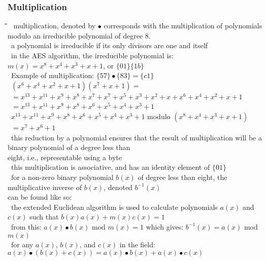 \documentclass[10pt,letterpaper]{scrartcl}
\newcommand{\tbul}{\textbullet}
\newcommand{\tend}{\>\textendash}
\newcommand{\tabDef}{\hspace{2em}\=\hspace{2em}\=\hspace{2em}\=\hspace{2em}\=\kill}
\begin{document}
\subsubsection*{Multiplication}\begin{tabbing}\tabDef
\tbul\ multiplication, denoted by $\bullet$ corresponds with the multiplication of polynomials modulo an irreducible polynomial of degree 8. \\
    \tend\ a polynomial is irreducible if its only divisors are one and itself \\
\tbul\ in the AES algorithm, the irreducible polynomial is: $m(x)=x^8+x^4+x^3+x+1$, or $\{01\}\{1b\}$ \\
\tbul\ Example of multiplication: $\{57\}\bullet \{83\} = \{c1\}$ \\
\>\ $(x^6 + x^4 + x^2 + x + 1)(x^7 + x + 1) = $ \\
\>\>\>\>\ $=x^{13} + x^{11} + x^9 + x^8 + x^7 + x^7 + x^5 + x^3 + x^2 + x + x^6 + x^4 + x^2 + x + 1$ \\
\>\>\>\>\ $=x^{13} + x^{11} + x^9 + x^8 + x^6 + x^5 + x^4 + x^3 + 1$ \\
\>\>\>\>\ $x^{13} + x^{11} + x^9 + x^8 + x^6 + x^5 + x^4 + x^3 + 1$ modulo $(x^8 + x^4 + x^3 + x + 1)$ \\
\>\>\>\>\ $=x^7 + x^6 + 1$ \\
\tbul\ this reduction by a polynomial ensures that the result of multiplication will be a binary polynomial of a degree less than\\ eight, i.e., representable using a byte \\
\tbul\ this multiplication is associative, and has an identity element of $\{01\}$ \\
\tbul\ for a non-zero binary polynomial $b(x)$ of degree less than eight, the multiplicative inverse of $b(x)$, denoted $b^{-1}(x)$\\ can be found like so: \\
    \tend\ the extended Euclidean algorithm is used to calculate polynomials $a(x)$ and $c(x)$ such that $b(x)a(x)+m(x)c(x)=1$\\
    \tend\ from this: $a(x)\bullet b(x)$ mod $m(x)=1$ which gives: $b^{-1}(x)=a(x)$ mod $m(x)$ \\
    \tend\ for any $a(x)$, $b(x)$, and $c(x)$ in the field: $a(x)\bullet (b(x)+c(x))=a(x)\bullet b(x)+a(x)\bullet c(x)$\end{tabbing}
\end{document}
